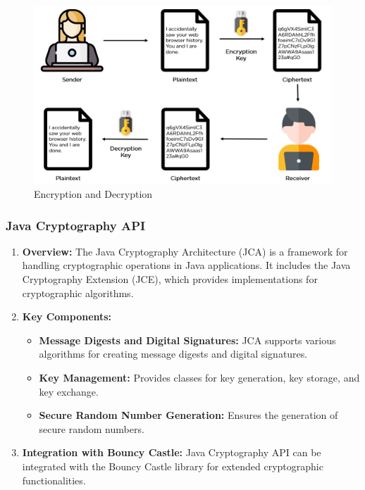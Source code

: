 \documentclass[11pt]{article}
\begin{document}
\begin{figure}[H]
    \centering
    \includegraphics[width=.95\textwidth]{decryption/decryption_0.jpg}
    \caption{Encryption and Decryption}
\end{figure}

\subsubsection{Java Cryptography API}
\begin{enumerate}
    \item \textbf{Overview:} The Java Cryptography Architecture (JCA) is a framework for handling cryptographic operations in Java applications. It includes the Java Cryptography Extension (JCE), which provides implementations for cryptographic algorithms.

    \item \textbf{Key Components:}
          \begin{itemize}
              \item \textbf{Message Digests and Digital Signatures:} JCA supports various algorithms for creating message digests and digital signatures.
              \item \textbf{Key Management:} Provides classes for key generation, key storage, and key exchange.
              \item \textbf{Secure Random Number Generation:} Ensures the generation of secure random numbers.
          \end{itemize}

    \item \textbf{Integration with Bouncy Castle:} Java Cryptography API can be integrated with the Bouncy Castle library for extended cryptographic functionalities.

\end{enumerate}
\end{document}
